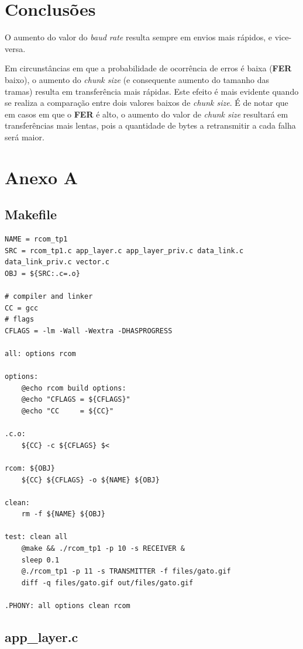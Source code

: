 \documentclass[11pt]{report}
\begin{document}
\chapter{Conclusões}

O aumento do valor do \textit{baud rate} resulta sempre em envios mais rápidos,
e vice-versa.

Em circunstâncias em que a probabilidade de ocorrência de erros é baixa
(\textbf{FER} baixo), o aumento do \textit{chunk size} (e consequente aumento
do tamanho das tramas) resulta em transferência mais rápidas. Este efeito é
mais evidente quando se realiza a comparação entre dois valores baixos de
\textit{chunk size}. É de notar que em casos em que o \textbf{FER} é alto,
o aumento do valor de \textit{chunk size} resultará em transferências mais
lentas, pois a quantidade de bytes a retransmitir a cada falha será maior.

\chapter*{Anexo A}

\section{Makefile}

\begin{lstlisting}
NAME = rcom_tp1
SRC = rcom_tp1.c app_layer.c app_layer_priv.c data_link.c data_link_priv.c vector.c
OBJ = ${SRC:.c=.o}

# compiler and linker
CC = gcc
# flags
CFLAGS = -lm -Wall -Wextra -DHASPROGRESS

all: options rcom

options:
	@echo rcom build options:
	@echo "CFLAGS = ${CFLAGS}"
	@echo "CC     = ${CC}"

.c.o:
	${CC} -c ${CFLAGS} $<

rcom: ${OBJ}
	${CC} ${CFLAGS} -o ${NAME} ${OBJ}

clean:
	rm -f ${NAME} ${OBJ}

test: clean all
	@make && ./rcom_tp1 -p 10 -s RECEIVER &
	sleep 0.1
	@./rcom_tp1 -p 11 -s TRANSMITTER -f files/gato.gif
	diff -q files/gato.gif out/files/gato.gif

.PHONY: all options clean rcom
\end{lstlisting}

\section{app\_layer.c}
\end{document}
